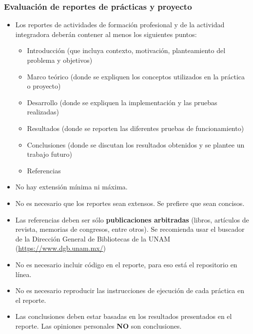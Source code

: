 \begin{frame}\frametitle{Evaluación de reportes de prácticas y proyecto}
  \begin{itemize}
  \item Los reportes de actividades de formación profesional y de la actividad integradora deberán contener al menos los siguientes puntos:
    \begin{itemize}
    \item Introducción (que incluya contexto, motivación, planteamiento del problema y objetivos)
    \item Marco teórico (donde se expliquen los conceptos utilizados en la práctica o proyecto)
    \item Desarrollo (donde se expliquen la implementación y las pruebas realizadas)
    \item Resultados (donde se reporten las diferentes pruebas de funcionamiento)
    \item Conclusiones (donde se discutan los resultados obtenidos y se plantee un trabajo futuro)
    \item Referencias
    \end{itemize}
  \item No hay extensión mínima ni máxima.
  \item No es necesario que los reportes sean extensos. Se prefiere que sean concisos.
  \item Las referencias deben ser sólo \textbf{publicaciones arbitradas} (libros, artículos de revista, memorias de congresos, entre otros). Se recomienda usar el buscador de la Dirección General de Bibliotecas de la UNAM (\url{https://www.dgb.unam.mx/})
  \item No es necesario incluir código en el reporte, para eso está el repositorio en línea.
  \item No es necesario reproducir las instrucciones de ejecución de cada práctica en el reporte.
  \item Las conclusiones deben estar basadas en los resultados presentados en el reporte. Las opiniones personales \textbf{NO} son conclusiones.
  \end{itemize}
\end{frame}


